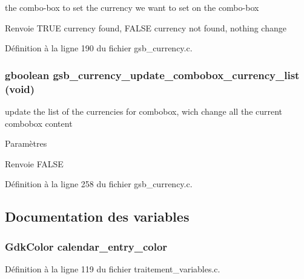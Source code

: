 the combo-\/box to set  the currency we want to set on the combo-\/box

\begin{DoxyReturn}{Renvoie}
TRUE currency found, FALSE currency not found, nothing change 
\end{DoxyReturn}


Définition à la ligne 190 du fichier gsb\_\-currency.c.

\subsubsection[{gsb\_\-currency\_\-update\_\-combobox\_\-currency\_\-list}]{\setlength{\rightskip}{0pt plus 5cm}gboolean gsb\_\-currency\_\-update\_\-combobox\_\-currency\_\-list (void)}\label{gsb__currency_8c_aa0749d5749e2bef8d4e3d4f19f5d4524}
update the list of the currencies for combobox, wich change all the current combobox content


\begin{DoxyParams}{Paramètres}
\item[{\em }]\end{DoxyParams}
\begin{DoxyReturn}{Renvoie}
FALSE 
\end{DoxyReturn}


Définition à la ligne 258 du fichier gsb\_\-currency.c.



\subsection{Documentation des variables}
\subsubsection[{calendar\_\-entry\_\-color}]{\setlength{\rightskip}{0pt plus 5cm}GdkColor {\bf calendar\_\-entry\_\-color}}\label{gsb__currency_8c_aa809fea280ab9cef6e16774b54a573ae}


Définition à la ligne 119 du fichier traitement\_\-variables.c.

